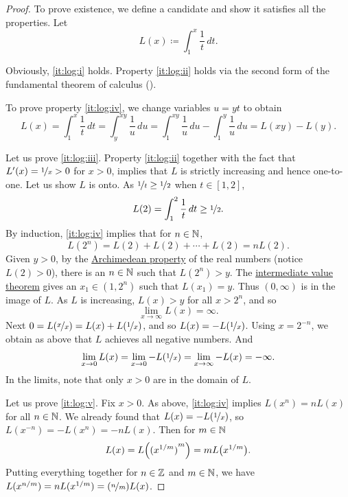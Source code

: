 \begin{proof}
To prove existence, we define a candidate and show it satisfies
all the properties.  Let
\begin{equation*}
L(x) \coloneqq \int_1^x \frac{1}{t}\,dt .
\end{equation*}

Obviously, \ref{it:log:i} holds.  Property \ref{it:log:ii} holds
via the second form of the fundamental theorem of calculus
().

To prove property \ref{it:log:iv},
we change variables $u=yt$ to obtain
\begin{equation*}
L(x) =
\int_1^{x} \frac{1}{t}\,dt
=
\int_y^{xy} \frac{1}{u}\,du
=
\int_1^{xy} \frac{1}{u}\,du
-
\int_1^{y} \frac{1}{u}\,du
=
L(xy)-L(y) .
\end{equation*}

Let us prove \ref{it:log:iii}.
Property \ref{it:log:ii} together with the fact that $L'(x) = \nicefrac{1}{x} > 0$ 
for $x > 0$, implies that $L$
is strictly increasing and hence one-to-one.
Let us show $L$ is onto.  
As $\nicefrac{1}{t} \geq \nicefrac{1}{2}$ when $t \in [1,2]$,
\begin{equation*}
L(2) = \int_1^2 \frac{1}{t} \,dt \geq \nicefrac{1}{2} .
\end{equation*}
By induction, \ref{it:log:iv} implies that for $n \in {\mathbb{N}}$,
\begin{equation*}
L(2^n) = L(2) + L(2) + \cdots + L(2) = n L(2) .
\end{equation*}
Given $y > 0$, 
by the \hyperref[thm:arch:i]{Archimedean property} of the real numbers
(notice $L(2) > 0$), there is an $n \in {\mathbb{N}}$ such that
$L(2^n) > y$.  The
\hyperref[IVT:thm]{intermediate value theorem}
gives an $x_1 \in (1,2^n)$ such that $L(x_1) = y$.  Thus
$(0,\infty)$ is in the image of $L$.
As $L$ is increasing, $L(x) > y$ for all $x > 2^n$, and so
\begin{equation*}
\lim_{x\to\infty} L(x) = \infty .
\end{equation*}
Next
$0 = L(\nicefrac{x}{x}) = L(x) + L(\nicefrac{1}{x})$, and
so $L(x) = - L(\nicefrac{1}{x})$.  Using $x=2^{-n}$, we obtain
as above that $L$ achieves all negative numbers.  And
\begin{equation*}
\lim_{x \to 0} L(x) = 
\lim_{x \to 0} -L(\nicefrac{1}{x})
=
\lim_{x \to \infty} -L(x)
=  - \infty .
\end{equation*}
In the limits, note that only $x > 0$ are in the domain of $L$.

Let us prove \ref{it:log:v}.
Fix $x > 0$.
As above, \ref{it:log:iv} implies
$L(x^n) = n L(x)$
for all $n \in {\mathbb{N}}$.
We already found that
$L(x) = - L(\nicefrac{1}{x})$,
so $L(x^{-n}) = - L(x^n) = -n L(x)$.  Then for $m \in {\mathbb{N}}$
\begin{equation*}
L(x) = L\Bigl({(x^{1/m})}^m\Bigr) = m L\bigl(x^{1/m}\bigr) .
\end{equation*}
Putting everything together for $n \in {\mathbb{Z}}$ and $m \in {\mathbb{N}}$, we have
$L(x^{n/m}) = n L(x^{1/m}) = (\nicefrac{n}{m}) L(x)$.


\end{proof}
